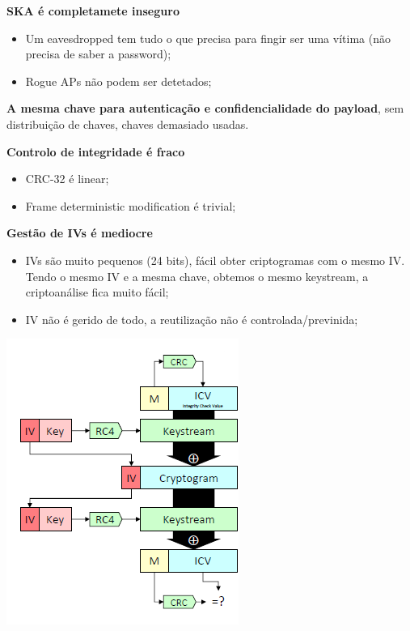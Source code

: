 \documentclass{article}
\begin{document}
\begin{flushleft}
  \textbf{SKA é completamete inseguro}
  \begin{itemize}
    \item Um eavesdropped tem tudo o que precisa para fingir ser uma vítima (não precisa de saber a password);
    \item Rogue APs não podem ser detetados; 
  \end{itemize}

  \textbf{A mesma chave para autenticação e confidencialidade do payload},
  sem distribuição de chaves, chaves demasiado usadas.

  \vspace{2mm}

  \textbf{Controlo de integridade é fraco}
  \begin{itemize}
    \item CRC-32 é linear;
    \item Frame deterministic modification é trivial;
  \end{itemize}

  \textbf{Gestão de IVs é mediocre}
  \begin{itemize}
    \item IVs são muito pequenos (24 bits), fácil obter criptogramas com
    o mesmo IV. Tendo o mesmo IV e a mesma chave, obtemos o mesmo keystream,
    a criptoanálise fica muito fácil;
    \item IV não é gerido de todo, a reutilização não é controlada/previnida;
  \end{itemize}
\end{flushleft}

\begin{center}
  \includegraphics[scale=0.6]{45}
\end{center}
\end{document}
